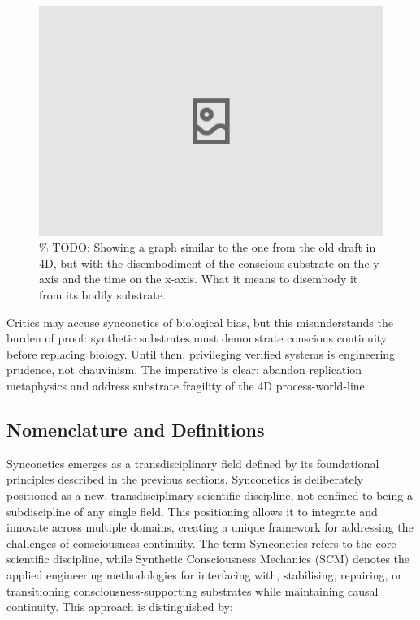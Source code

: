 \documentclass[10pt]{article}
\begin{document}
\begin{sloppypar}
  \begin{figure}[ht!]
    \centering
    \includegraphics[width=\textwidth]{figures/4d-trajectory-disembodiment.png}
    \caption{\% TODO: Showing a graph similar to the one from the old draft in 4D, but with the disembodiment of the conscious substrate on the y-axis and the time on the x-axis. What it means to disembody it from its bodily substrate.}
    \label{fig:4d-trajectory-disembodiment}
  \end{figure}

  Critics may accuse synconetics of biological bias, but this misunderstands the burden of proof: synthetic substrates must demonstrate conscious continuity before replacing biology. Until then, privileging verified systems is engineering prudence, not chauvinism. The imperative is clear: abandon replication metaphysics and address substrate fragility of the 4D process-world-line.

  \subsection{Nomenclature and Definitions}
  \label{sec:nomenclature-definitions}

  Synconetics emerges as a transdisciplinary field defined by its foundational principles described in the previous sections. Synconetics is deliberately positioned as a new, transdisciplinary scientific discipline, not confined to being a subdiscipline of any single field. This positioning allows it to integrate and innovate across multiple domains, creating a unique framework for addressing the challenges of consciousness continuity. The term Synconetics refers to the core scientific discipline, while Synthetic Consciousness Mechanics (SCM) denotes the applied engineering methodologies for interfacing with, stabilising, repairing, or transitioning consciousness-supporting substrates while maintaining causal continuity. This approach is distinguished by:


\end{sloppypar}
\end{document}
